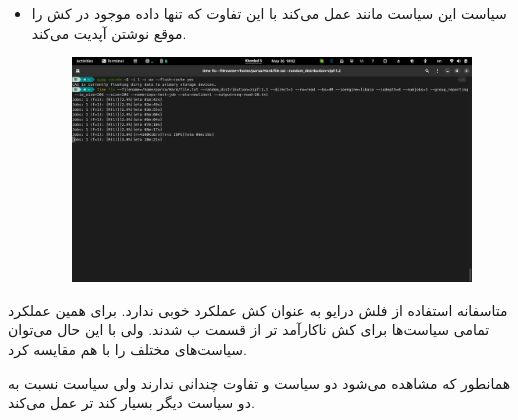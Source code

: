 \documentclass{article}
\begin{document}
\begin{itemize}
\begin{figure}[H]
    \end{figure}
    \item سیاست 
    این سیاست مانند 
    عمل می‌کند با این تفاوت که تنها داده موجود در کش را موقع نوشتن آپدیت می‌کند.
    \begin{figure}[H]
        \centering
        \includegraphics[width=\textwidth]{images/3-d-wa.png}
    \end{figure}
\end{itemize}

متاسفانه استفاده از فلش درایو به عنوان کش عملکرد خوبی ندارد. برای همین عملکرد 
تمامی سیاست‌ها برای کش ناکارآمد تر از قسمت ب شدند. ولی با این حال می‌توان 
سیاست‌های مختلف را با هم مقایسه کرد. 

همانطور که مشاهده می‌شود دو سیاست 
و 
تفاوت چندانی ندارند ولی سیاست 
نسبت به دو سیاست دیگر بسیار کند تر عمل می‌کند.

\subsection{}
\end{document}
